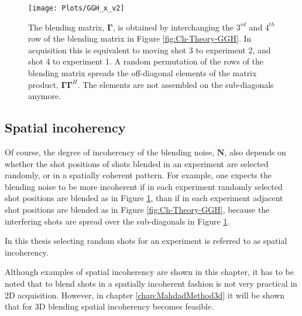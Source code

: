 \begin{figure}
	\centering
	\texttt{[image: Plots/GGH\_x\_v2]}
	\caption{The blending matrix, $\mathbf{\Gamma}$, is obtained by interchanging the $3^{rd}$ and $4^{th}$ row of the blending matrix in Figure \ref{fig:Ch-Theory-GGH}. In acquisition this is equivalent to moving shot 3 to experiment 2, and shot 4 to experiment 1. A random permutation of the rows of the blending matrix spreads the off-diagonal elements of the matrix product, $\mathbf{\Gamma\Gamma}^H$. The elements are not assembled on the sub-diagonals anymore.}
	\label{fig:Ch-Theory-GGHx}
\end{figure}

\subsection*{Spatial incoherency}

Of course, the degree of incoherency of the blending noise, $\mathbf{N}$, also depends on whether the shot positions of shots blended in an experiment are selected randomly, or in a spatially coherent pattern. For example, one expects the blending noise to be more incoherent if in each experiment randomly selected shot positions are blended as in Figure \ref{fig:Ch-Theory-GGHx}, than if in each experiment adjacent shot positions are blended as in Figure \ref{fig:Ch-Theory-GGH}, because the interfering shots are spread over the sub-diagonals in Figure \ref{fig:Ch-Theory-GGHx}.

In this thesis selecting random shots for an experiment is referred to as spatial incoherency.

Although examples of spatial incoherency are shown in this chapter, it has to be noted that to blend shots in a spatially incoherent fashion is not very practical in 2D acquisition. However, in chapter \ref{chap:MahdadMethod3d} it will be shown that for 3D blending spatial incoherency becomes feasible.


